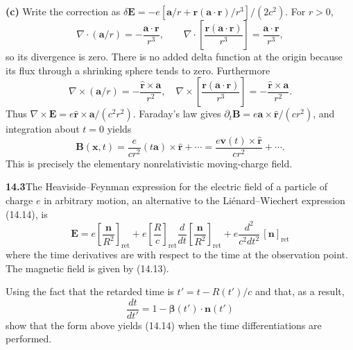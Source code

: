 \textbf{(c)} Write the correction as
$\delta\mathbf E=-e[\mathbf a/r+
\mathbf r(\mathbf a\cdot\mathbf r)/r^3]/(2c^2)$.
For $r>0$,
\[
\nabla\cdot(\mathbf a/r)=-\frac{\mathbf a\cdot\mathbf r}{r^3},\qquad
\nabla\cdot\left[\frac{\mathbf r(\mathbf a\cdot\mathbf r)}{r^3}\right]
=\frac{\mathbf a\cdot\mathbf r}{r^3},
\]
so its divergence is zero. There is no added delta function at the origin
because its flux through a shrinking sphere tends to zero.
Furthermore
\[
\nabla\times(\mathbf a/r)=-\frac{\hat{\mathbf r}\times\mathbf a}{r^2},
\quad
\nabla\times\left[\frac{\mathbf r(\mathbf a\cdot\mathbf r)}{r^3}\right]
=-\frac{\hat{\mathbf r}\times\mathbf a}{r^2}.
\]
Thus $\nabla\times\mathbf E=e\hat{\mathbf r}\times\mathbf a/(c^2r^2)$.
Faraday's law gives $\partial_t\mathbf B=e\mathbf a\times
\hat{\mathbf r}/(cr^2)$, and integration about $t=0$ yields
\[
\boxed{\mathbf B(\mathbf x,t)=\frac{e}{cr^2}
(t\mathbf a)\times\hat{\mathbf r}+\cdots
=\frac{e\mathbf v(t)\times\hat{\mathbf r}}{cr^2}+\cdots.}
\]
This is precisely the elementary nonrelativistic moving-charge field.

\par\bigskip
\noindent\textbf{14.3}\quad The Heaviside--Feynman expression for the electric field of a particle of charge $e$ in arbitrary motion, an alternative to the Li\'enard--Wiechert expression (14.14), is
\[
\mathbf{E}=e\left[\frac{\mathbf{n}}{R^{2}}\right]_{\mathrm{ret}}+e\left[\frac{R}{c}\right]_{\mathrm{ret}}\frac{d}{dt}\left[\frac{\mathbf{n}}{R^{2}}\right]_{\mathrm{ret}}+e\frac{d^{2}}{c^{2}dt^{2}}\,[\mathbf{n}]_{\mathrm{ret}}
\]
where the time derivatives are with respect to the time at the observation point. The magnetic field is given by (14.13).

Using the fact that the retarded time is $t'=t-R(t')/c$ and that, as a result,
\[
\frac{dt}{dt'}=1-\boldsymbol{\beta}(t')\cdot\mathbf{n}(t')
\]
show that the form above yields (14.14) when the time differentiations are performed.
\solution

